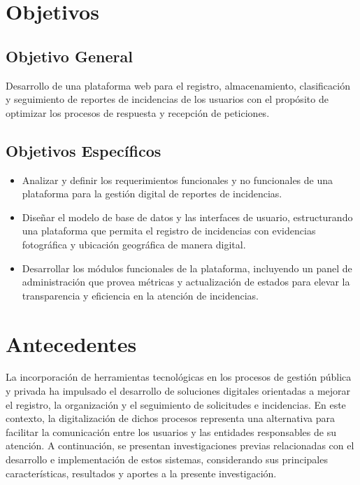 \clearpage

\section{Objetivos}
\label{subsec:objetivos}
\subsection{Objetivo General}

Desarrollo de una plataforma web para el registro, almacenamiento, clasificación y seguimiento de reportes de incidencias de los usuarios con el propósito de optimizar los procesos de respuesta y recepción de peticiones.

\subsection{Objetivos Específicos}
\begin{itemize}
	\item Analizar y definir los requerimientos funcionales y no funcionales de una plataforma para la gestión digital de reportes de incidencias. 
	\item Diseñar el modelo de base de datos y las interfaces de usuario, estructurando una plataforma que permita el registro de incidencias con evidencias fotográfica y ubicación geográfica de manera digital. 
	\item Desarrollar los módulos funcionales de la plataforma, incluyendo un panel de administración que provea métricas y actualización de estados para elevar la transparencia y eficiencia en la atención de incidencias. 
\end{itemize}

\newpage

\section{Antecedentes}
\label{subsec:antecedentes}
La incorporación de herramientas tecnológicas en los procesos de gestión pública y privada ha impulsado el desarrollo de soluciones digitales orientadas a mejorar el registro, la organización y el seguimiento de solicitudes e incidencias. En este contexto, la digitalización de dichos procesos representa una alternativa para facilitar la comunicación entre los usuarios y las entidades responsables de su atención. A continuación, se presentan investigaciones previas relacionadas con el desarrollo e implementación de estos sistemas, considerando sus principales características, resultados y aportes a la presente investigación.

